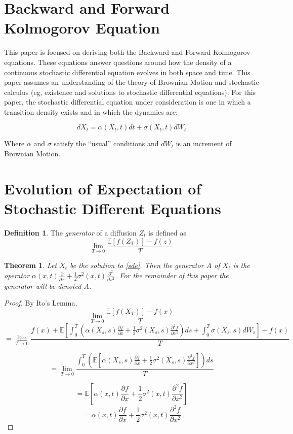 \documentclass{article}
\newtheorem{theorem}{Theorem}
\theoremstyle{definition}
\newtheorem{definition}{Definition}
\begin{document}
\section{Backward and Forward Kolmogorov Equation}

This paper is focused on deriving both the Backward and Forward Kolmogorov equations.  These equations answer questions around how the density of a continuous stochastic differential equation evolves in both space and time.  This paper assumes an understanding of the theory of Brownian Motion and stochastic calculus (eg, existence and solutions to stochastic differential equations). For this paper, the stochastic differential equation under consideration is one in which a transition density exists and in which the dynamics are:

\begin{equation} \label{sde}
dX_t=\alpha(X_t, t) dt+\sigma(X_t, t) dW_t
\end{equation}

Where \(\alpha\) and \(\sigma\) satisfy the ``usual'' conditions and \(dW_t\) is an increment of Brownian Motion.

\section{Evolution of Expectation of Stochastic Different Equations}

\begin{definition}
	The \emph{generator} of a diffusion \(Z_t\) is defined as 
	\[\lim_{T \to 0} \frac{\mathbb{E}[f(Z_T)]-f(z)}{T} \]
\end{definition}

\begin{theorem}
Let \(X_t\) be the solution to \ref{sde}.  Then the generator \(A\) of \(X_t\) is the operator \(\alpha(x, t) \frac{\partial}{\partial x} +\frac{1}{2} \sigma^2(x, t) \frac{\partial ^2}{\partial x^2} \).  For the remainder of this paper the generator will be denoted \(A\).  

\end{theorem}

\begin{proof}
	By Ito's Lemma,
	\[\lim_{T \to 0} \frac{\mathbb{E}[f(X_T)]-f(x)}{T}\]
	\[=\lim_{T \to 0} \frac{f(x)+\mathbb{E}\left[ \int_0 ^ T \left( \alpha(X_s, s) \frac{\partial f}{\partial x} +\frac{1}{2} \sigma^2(X_s, s) \frac{\partial^2 f}{\partial x^2} \right) ds + \int_0^T \sigma(X_s, s)dW_s \right]-f(x)}{T} \]
	
	\[ = \lim_{T \to 0} \frac{ \int_0 ^ T \left( \mathbb{E}\left[\alpha(X_s, s) \frac{\partial f}{\partial x} +\frac{1}{2} \sigma^2(X_s, s) \frac{\partial^2 f}{\partial x^2} \right] \right) ds  }{T} \]
	
	\[ = \mathbb{E}\left[\alpha(x, t) \frac{\partial f}{\partial x} +\frac{1}{2} \sigma^2(x, t) \frac{\partial^2 f}{\partial x^2} \right] \]
	\[ = \alpha(x, t) \frac{\partial f}{\partial x} +\frac{1}{2} \sigma^2(x, t) \frac{\partial^2 f}{\partial x^2}\]
	
\end{proof}
\end{document}
